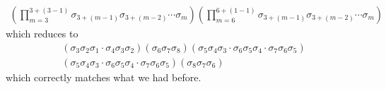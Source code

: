 \begin{example}
\begin{gather*}
        \left(    \prod_{m = 3}^{3 + (3-1)}
        \sigma_{3 + (m-1)}
        \sigma_{3 + (m-2)}
        \cdots 
        \sigma_{m} \right)
        \left(     \prod_{m = 6}^{6 + (1-1)}
        \sigma_{3 + (m-1)}
        \sigma_{3 + (m-2)}
        \cdots 
        \sigma_{m} \right)
    \end{gather*}
    which reduces to 
    \begin{gather*}
        (\sigma_3\sigma_2\sigma_1 \cdot \sigma_4\sigma_3\sigma_2)
        (\sigma_6 \sigma_7\sigma_8)(\sigma_5\sigma_4\sigma_3\cdot \sigma_6\sigma_5\sigma_4 \cdot \sigma_7\sigma_6\sigma_5)
        \\
        (\sigma_5\sigma_4\sigma_3\cdot \sigma_6\sigma_5\sigma_4 \cdot \sigma_7\sigma_6\sigma_5)
        (\sigma_8\sigma_7\sigma_6)
    \end{gather*}
    which correctly matches what we had before. 
\end{example}

